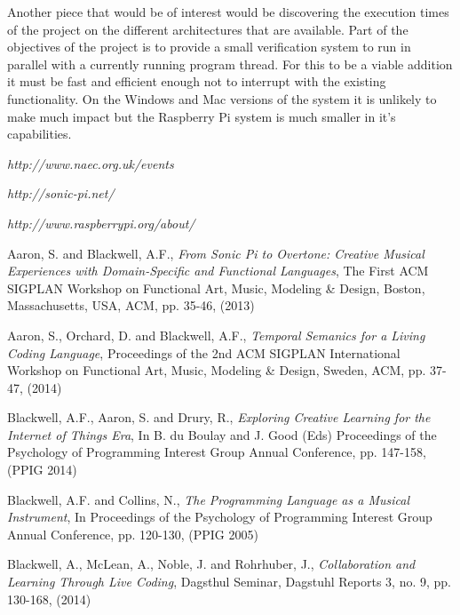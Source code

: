 \documentclass[11pt]{scrartcl}
\begin{document}
Another piece that would be of interest would be discovering the execution 
times of the project on the different architectures that are available. Part 
of the objectives of the project is to provide a small verification system to 
run in parallel with a currently running program thread. For this to be a 
viable addition it must be fast and efficient enough not to interrupt with the 
existing functionality. On the Windows and Mac versions of the system it is 
unlikely to make much impact but the Raspberry Pi system is much smaller in 
it's capabilities.


\begin{thebibliography}{9}

  \emph{http://www.naec.org.uk/events}

  \emph{http://sonic-pi.net/}

  \emph{http://www.raspberrypi.org/about/}

  Aaron, S. and Blackwell, A.F.,
  \emph{From Sonic Pi to Overtone: Creative Musical Experiences with Domain-Specific and Functional Languages},
  The First ACM SIGPLAN Workshop on Functional Art, Music, Modeling \& Design,
  Boston, Massachusetts, USA,
  ACM, pp. 35-46,
  (2013)

  Aaron, S., Orchard, D. and Blackwell, A.F.,
  \emph{Temporal Semanics for a Living Coding Language},
  Proceedings of the 2nd ACM SIGPLAN International Workshop on Functional Art, Music, Modeling \& Design,
  Sweden, ACM, pp. 37-47,
  (2014)

  Blackwell, A.F., Aaron, S. and Drury, R., 
  \emph{Exploring Creative Learning for the Internet of Things Era},
  In B. du Boulay and J. Good (Eds) Proceedings of the Psychology of Programming Interest Group Annual Conference, 
  pp. 147-158,
  (PPIG 2014)

  Blackwell, A.F. and Collins, N.,
  \emph{The Programming Language as a Musical Instrument},
  In Proceedings of the Psychology of Programming Interest Group Annual Conference,
  pp. 120-130,
  (PPIG 2005)

  Blackwell, A., McLean, A., Noble, J. and Rohrhuber, J.,
  \emph{Collaboration and Learning Through Live Coding},
  Dagsthul Seminar, Dagstuhl Reports 3,
  no. 9, pp. 130-168,
  (2014)


\end{thebibliography}
\end{document}

